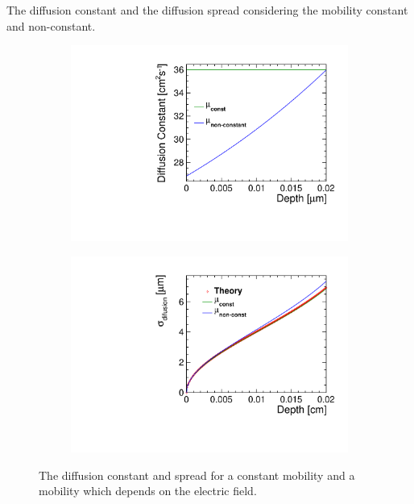 The diffusion constant and the diffusion spread considering the
mobility constant and non-constant.
\begin{figure}[htbp]
  \centering
  \begin{subfigure}[b]{0.49\textwidth}
    \centering
    \includegraphics[width=\textwidth]{figures/ChargeSharing/B06_DiffusionConstant.pdf}
    \caption{}\label{fig:}
  \end{subfigure}\hfill
  \begin{subfigure}[b]{0.49\textwidth}
    \centering
    \includegraphics[width=\textwidth]{figures/ChargeSharing/B06_SigmaDiffusion.pdf}
    \caption{}\label{fig:}
  \end{subfigure} 
  \caption{The diffusion constant and spread for a constant mobility
    and a mobility which depends on the electric field. }\label{fig:}
\end{figure}

